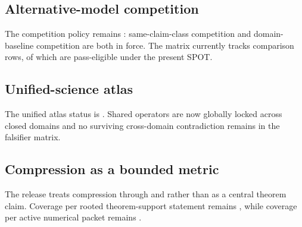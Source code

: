 \subsection{Alternative-model competition}
The competition policy remains : same-claim-class competition and domain-baseline competition are both in force. The matrix currently tracks  comparison rows, of which  are pass-eligible under the present SPOT.

\subsection{Unified-science atlas}
The unified atlas status is . Shared operators are now globally locked across closed domains and no surviving cross-domain contradiction remains in the falsifier matrix.

\subsection{Compression as a bounded metric}
The release treats compression through  and  rather than as a central theorem claim. Coverage per rooted theorem-support statement remains , while coverage per active numerical packet remains .
